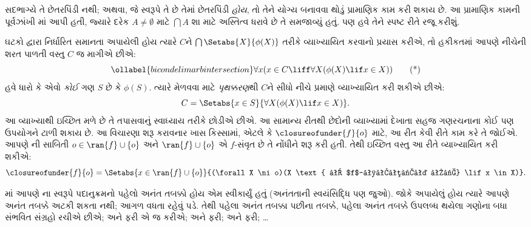 સદભાગ્યે તે છેતરપિંડી નથી; અથવા, જે સ્વરૂપે તે છે તેમાં
છેતરપિંડી \emph{હોય}, તો તેને યોગ્ય બનાવવા થોડું પ્રામાણિક
કામ કરી શકાય છે. આ પ્રામાણિક કામની પૂર્વઝાંખી
માં આપી હતી,
જ્યારે દરેક $A \neq \emptyset$ માટે $\bigcap A$ શા માટે
અસ્તિત્વ ધરાવે છે તે સમજાવ્યું હતું. પણ હવે તેને સ્પષ્ટ
રીતે રજૂ કરીશું.

ઘટકો દ્વારા નિર્ધારિત સમાનતા અપાયેલી હોય ત્યારે $C$ને
$\bigcap\Setabs{X}{\phi(X)}$ તરીકે વ્યાખ્યાયિત કરવાનો પ્રયાસ
કરીએ, તો હકીકતમાં આપણે નીચેની શરત પાળતી વસ્તુ $C$
જ માગીએ છીએ:
\begin{equation}\ollabel{bicondelimarbintersection}
	\forall x(x \in C \liff \forall X(\phi(X) \lif x \in X))\tag{*}
\end{equation}
હવે ધારો કે એવો \emph{કોઈ} ગણ $S$ છે કે $\phi(S)$.
ત્યારે  મેળવવા માટે
\emph{પૃથક્કરણ}થી $C$ને સીધો નીચે પ્રમાણે વ્યાખ્યાયિત
કરી શકીએ છીએ:
\[
	C = \Setabs{x \in S}{\forall X(\phi(X) \lif x \in X)}.
\]
આ વ્યાખ્યાથી ઇચ્છિત 
મળે છે તે તપાસવાનું સ્વાધ્યાય તરીકે છોડીએ છીએ.
આ સામાન્ય રીતથી છેદોની વ્યાખ્યામાં દેખાતા સહજ ગણરચનાના
કોઈ પણ ઉપયોગને ટાળી શકાય છે. આ વિચારણા શરૂ કરાવનાર
ખાસ કિસ્સામાં, એટલે કે $\closureofunder{f}{o}$ માટે,
આ રીત કેવી રીતે કામ કરે તે જોઈએ. આપણે
ની
સાબિતી $o \in \ran{f}\cup\{o\}$ અને
$\ran{f} \cup \{o\}$ એ $f$-સંવૃત છે તે નોંધીને શરૂ
કરી હતી. તેથી ઇચ્છિત વસ્તુ આ રીતે વ્યાખ્યાયિત કરી શકીએ:
\[
	\closureofunder{f}{o} = \Setabs{x \in \ran{f} \cup \{o\}}{(\forall X \ni o)(X \text{ એ $f$-સંવૃત છે} \lif x \in X)}.
\]
\endgroup


\OLEndChapterHook
\endgroup

\begingroup
\makeatletter{}\makeatother

\label{guunit:OLP-0547}


\begingroup
\makeatletter{}\makeatother


\label{guunit:OLP-0548}


માં આપણે \stagesinf{}ના સ્વરૂપે પદાનુક્રમનો
પહેલો અનંત તબક્કો હોય એમ સ્વીકાર્યું હતું (અનંતતાની સ્વયંસિદ્ધિ
પણ જુઓ). જોકે \stagessucc{} અપાયેલું હોય ત્યારે આપણે અનંત
તબક્કે અટકી શકતા નથી; આગળ વધતા રહેવું પડે. તેથી પહેલા
અનંત તબક્કા પછીના તબક્કે, પહેલા અનંત તબક્કે ઉપલબ્ધ થયેલા
ગણોના બધા સંભવિત સંગ્રહો રચીએ છીએ; અને ફરી એ જ કરીએ;
અને ફરી; અને ફરી; \dots


